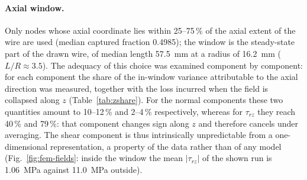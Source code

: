 \paragraph{Axial window.}
Only nodes whose axial coordinate lies within 25--75\,\% of the axial extent of the wire are used (median captured fraction 0.4985); the window is the steady-state part of the drawn wire, of median length 57.5~mm at a radius of 16.2~mm ($L/R \approx 3.5$). %
The adequacy of this choice was examined component by component: for each component the share of the in-window variance attributable to the axial direction was measured, together with the loss incurred when the field is collapsed along $z$ (Table~\ref{tab:zshare}). For the normal components these two quantities amount to 10--12\,\% and 2--4\,\% respectively, whereas for $\tau_{rz}$ they reach 40\,\% and 79\,\%: that component changes sign along $z$ and therefore cancels under averaging. %
The shear component is thus intrinsically unpredictable from a one-dimensional representation, a property of the data rather than of any model (Fig.~\ref{fig:fem-fields}: inside the window the mean $|\tau_{rz}|$ of the shown run is 1.06~MPa against 11.0~MPa outside). %

